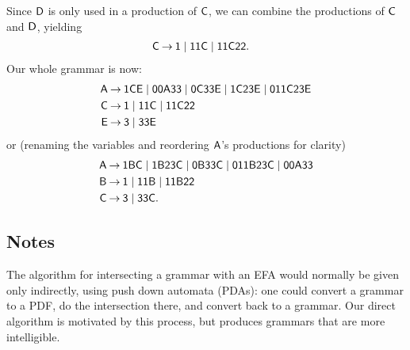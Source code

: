 Since $\mathsf{D}$ is only used in a production of $\mathsf{C}$,
we can combine the productions of $\mathsf{C}$ and $\mathsf{D}$, yielding
\begin{align*}
\mathsf{C} &\mathbin{\to} \mathsf{1} \mid \mathsf{11C} \mid \mathsf{11C22} .
\end{align*}
Our whole grammar is now:
\begin{align*}
\mathsf{A} &\mathbin{\to} \mathsf{1CE} \mid \mathsf{00A33} \mid \mathsf{0C33E} \mid
  \mathsf{1C23E} \mid \mathsf{011C23E} \\
\mathsf{C} &\mathbin{\to} \mathsf{1} \mid \mathsf{11C} \mid \mathsf{11C22} \\
\mathsf{E} &\mathbin{\to} \mathsf{3} \mid \mathsf{33E}
\end{align*}
or (renaming the variables and reordering $\mathsf{A}$'s productions for clarity)
\begin{align*}
\mathsf{A} &\mathbin{\to} \mathsf{1BC} \mid \mathsf{1B23C} \mid \mathsf{0B33C}
  \mid \mathsf{011B23C} \mid \mathsf{00A33} \\
\mathsf{B} &\mathbin{\to} \mathsf{1} \mid \mathsf{11B} \mid \mathsf{11B22} \\
\mathsf{C} &\mathbin{\to} \mathsf{3} \mid \mathsf{33C} .
\end{align*}

%

\subsection{Notes}

The algorithm for intersecting a grammar with an EFA would normally be given
only indirectly, using push down automata (PDAs): one could convert a grammar
to a PDF, do the intersection there, and convert back to a grammar.  Our direct
algorithm is motivated by this process, but produces grammars that are more
intelligible.

